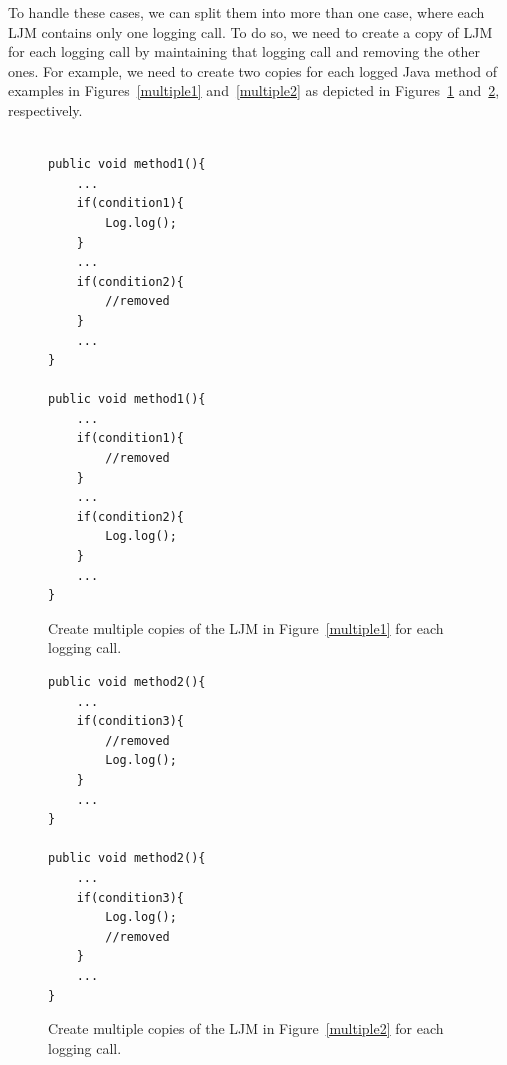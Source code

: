 To handle these cases, we can split them into more than one case, where each LJM contains only one logging call. To do so, we need to create a copy of LJM for each logging call by maintaining that logging call and removing the other ones. For example, we need to create two copies for each logged Java method of examples in Figures~\ref{multiple1} and~\ref{multiple2} as depicted in Figures~\ref{multiple1-one} and~\ref{multiple2-one}, respectively.


\begin{figure}[H]
\def\baselinestretch{1}
\begin{lstlisting}

public void method1(){
	...
	if(condition1){
		Log.log();
	}
	...
	if(condition2){
		//removed
	}
	...
}

public void method1(){
	...
	if(condition1){
		//removed
	}
	...
	if(condition2){
		Log.log();
	}
	...
}

\end{lstlisting}
\caption{Create multiple copies of the LJM in Figure~\ref{multiple1} for each logging call.\label{multiple1-one}}
\end{figure}



\begin{figure}[H]
\def\baselinestretch{1}
\begin{lstlisting}
public void method2(){
	...
	if(condition3){
		//removed
		Log.log();
	}
	...
}

public void method2(){
	...
	if(condition3){
		Log.log();
		//removed
	}
	...
}

\end{lstlisting}
\caption{Create multiple copies of the LJM in Figure~\ref{multiple2} for each logging call.\label{multiple2-one}}
\end{figure}

